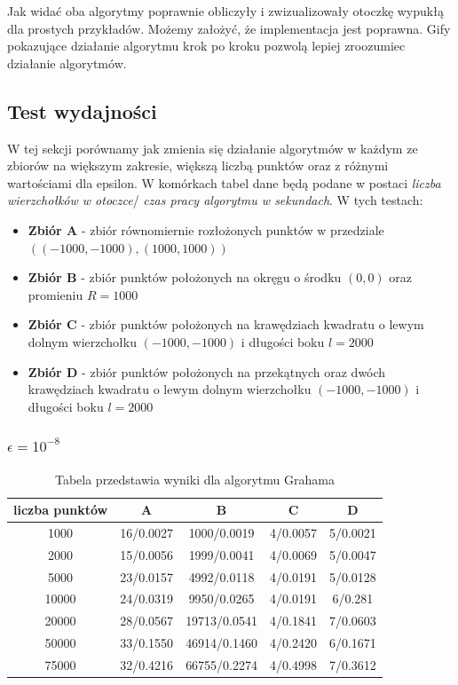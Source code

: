 \documentclass[12pt, a4paper]{article}
\begin{document}
Jak widać oba algorytmy poprawnie obliczyły i zwizualizowały otoczkę wypukłą dla prostych przykładów. Możemy założyć, że implementacja
jest poprawna. Gify pokazujące działanie algorytmu krok po kroku pozwolą lepiej zroozumiec działanie algorytmów.

\subsection{Test wydajności}
W tej sekcji porównamy jak zmienia się działanie algorytmów w każdym ze zbiorów na większym zakresie, większą liczbą punktów
oraz z różnymi wartościami dla epsilon. W komórkach tabel dane będą podane w postaci \textit{liczba wierzchołków w otoczce}/\textit{
czas pracy algorytmu w sekundach}. W tych testach:
\begin{itemize}
    \item \textbf{Zbiór A} - zbiór równomiernie rozłożonych punktów w przedziale $((-1000,-1000),(1000,1000))$
    \item \textbf{Zbiór B} - zbiór punktów położonych na okręgu o środku $(0,0)$ oraz promieniu $R=1000$
    \item \textbf{Zbiór C} - zbiór punktów położonych na krawędziach kwadratu o lewym dolnym wierzchołku $(-1000,-1000)$ i długości boku $l = 2000$
    \item \textbf{Zbiór D} - zbiór punktów położonych na przekątnych oraz dwóch krawędziach kwadratu o lewym dolnym
     wierzchołku $(-1000,-1000)$ i długości boku $l = 2000$
\end{itemize}

\subsubsection{$\epsilon=10^{-8}$}
\begin{table}[h]
    \centering
    \begin{tabular}{|c||c|c|c|c|}
        \hline
        liczba punktów & A & B & C & D \\
        \hline\hline
        1000 & 16/0.0027 & 1000/0.0019 & 4/0.0057 & 5/0.0021\\
        \hline
        2000 & 15/0.0056 & 1999/0.0041 & 4/0.0069 & 5/0.0047\\
        \hline
        5000 & 23/0.0157 & 4992/0.0118 & 4/0.0191 & 5/0.0128\\
        \hline
        10000 & 24/0.0319 & 9950/0.0265 & 4/0.0191 & 6/0.281\\
        \hline
        20000 & 28/0.0567 & 19713/0.0541 & 4/0.1841 & 7/0.0603\\
        \hline
        50000 & 33/0.1550 & 46914/0.1460 & 4/0.2420 & 6/0.1671\\
        \hline
        75000 & 32/0.4216 & 66755/0.2274 & 4/0.4998 & 7/0.3612\\
        \hline 
    \end{tabular}
    \caption{Tabela przedstawia wyniki dla algorytmu Grahama}
    \label{Graham_normalny}
\end{table}
\end{document}
